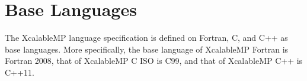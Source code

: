 






\section{Base Languages}

The XcalableMP language specification is defined on Fortran, C, and C++
as base languages. More specifically, the base language of XcalableMP
Fortran is Fortran 2008, that of XcalableMP C ISO is C99, and that of
XcalableMP C++ is C++11.
